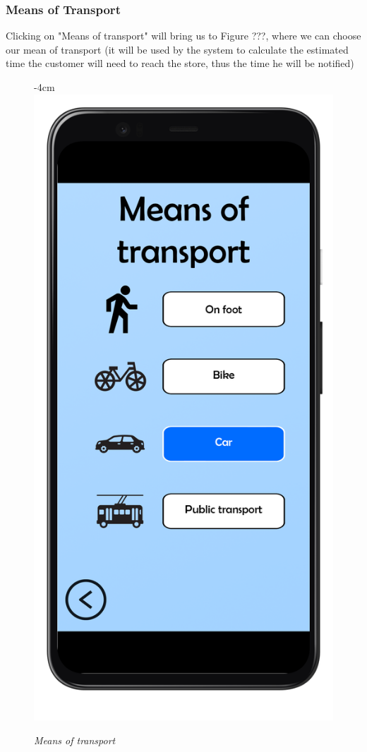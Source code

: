 \documentclass{article}
\begin{document}
		\subsubsection{Means of Transport}
		
		Clicking on "Means of transport" will bring us to Figure ???, where we can choose our mean of transport (it will be used by the system to calculate the estimated time the customer will need to reach the store, thus the time he will be notified)
		
		\begin{figure}[H]
			\begin{adjustwidth} {-4cm}{}
				\centering
				\includegraphics[scale=0.45]{../Mockups/MeansOfTransport.png}\\
			\end{adjustwidth}
			\caption{\emph{Means of transport}}
		\end{figure}
\end{document}
